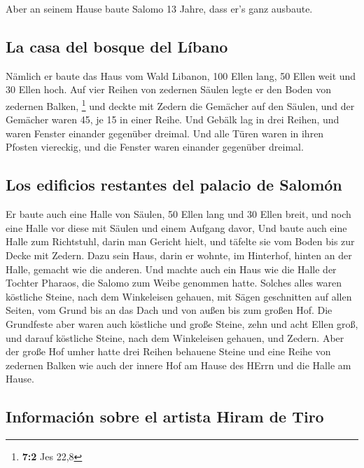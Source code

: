  Aber an seinem Hause baute Salomo 13 Jahre, dass er's
ganz ausbaute.

\hypertarget{la-casa-del-bosque-del-luxedbano}{%
\subsection{La casa del bosque del
Líbano}\label{la-casa-del-bosque-del-luxedbano}}

 Nämlich er baute das Haus vom Wald Libanon, 100 Ellen
lang, 50 Ellen weit und 30 Ellen hoch. Auf vier Reihen von zedernen
Säulen legte er den Boden von zedernen Balken, \footnote{\textbf{7:2}
  Jes 22,8}  und deckte mit Zedern die Gemächer auf den
Säulen, und der Gemächer waren 45, je 15 in einer Reihe. 
Und Gebälk lag in drei Reihen, und waren Fenster einander gegenüber
dreimal.  Und alle Türen waren in ihren Pfosten viereckig,
und die Fenster waren einander gegenüber dreimal.

\hypertarget{los-edificios-restantes-del-palacio-de-salomuxf3n}{%
\subsection{Los edificios restantes del palacio de
Salomón}\label{los-edificios-restantes-del-palacio-de-salomuxf3n}}

 Er baute auch eine Halle von Säulen, 50 Ellen lang und 30
Ellen breit, und noch eine Halle vor diese mit Säulen und einem Aufgang
davor,  Und baute auch eine Halle zum Richtstuhl, darin
man Gericht hielt, und täfelte sie vom Boden bis zur Decke mit Zedern.
 Dazu sein Haus, darin er wohnte, im Hinterhof, hinten an
der Halle, gemacht wie die anderen. Und machte auch ein Haus wie die
Halle der Tochter Pharaos, die Salomo zum Weibe genommen hatte.
 Solches alles waren köstliche Steine, nach dem
Winkeleisen gehauen, mit Sägen geschnitten auf allen Seiten, vom Grund
bis an das Dach und von außen bis zum großen Hof.  Die
Grundfeste aber waren auch köstliche und große Steine, zehn und acht
Ellen groß,  und darauf köstliche Steine, nach dem
Winkeleisen gehauen, und Zedern.  Aber der große Hof
umher hatte drei Reihen behauene Steine und eine Reihe von zedernen
Balken wie auch der innere Hof am Hause des HErrn und die Halle am
Hause.

\hypertarget{informaciuxf3n-sobre-el-artista-hiram-de-tiro}{%
\subsection{Información sobre el artista Hiram de
Tiro}\label{informaciuxf3n-sobre-el-artista-hiram-de-tiro}}

